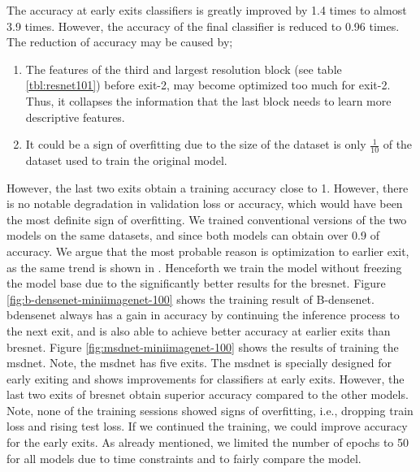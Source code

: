 The accuracy at early exits classifiers is greatly improved by 1.4 times to almost 3.9 times. However, the accuracy of the final classifier is reduced to 0.96 times. The reduction of accuracy may be caused by;
\begin{enumerate}
	\item The features of the third and largest resolution block (see table \ref{tbl:resnet101}) before exit-2, may become optimized too much for exit-2. Thus, it collapses the information that the last block needs to learn more descriptive features. 
	\item It could be a sign of overfitting due to the size of the dataset is only $\frac{1}{10}$ of the dataset used to train the original model. 
\end{enumerate}
However, the last two exits obtain a training accuracy close to 1. However, there is no notable degradation in validation loss or accuracy, which would have been the most definite sign of overfitting. We trained conventional versions of the two models on the same datasets, and since both models can obtain over 0.9 of accuracy. We argue that the most probable reason is optimization to earlier exit, as the same trend is shown in \cite{huang_multi-scale_2017}.
Henceforth we train the model without freezing the model base due to the significantly better results for the \gls{bresnet}. Figure \ref{fig:b-densenet-miniimagenet-100} shows the training result of B-\gls{densenet}. \gls{bdensenet} always has a gain in accuracy by continuing the inference process to the next exit, and is also able to achieve better accuracy at earlier exits than \gls{bresnet}. Figure \ref{fig:msdnet-miniimagenet-100} shows the results of training the \gls{msdnet}. Note, the \gls{msdnet} has five exits. The \gls{msdnet} is specially designed for early exiting and shows improvements for classifiers at early exits. However, the last two exits of \gls{bresnet} obtain superior accuracy compared to the other models. 
Note, none of the training sessions showed signs of overfitting, i.e., dropping train loss and rising test loss. If we continued the training, we could improve accuracy for the early exits. As already mentioned, we limited the number of epochs to 50 for all models due to time constraints and to fairly compare the model. 
